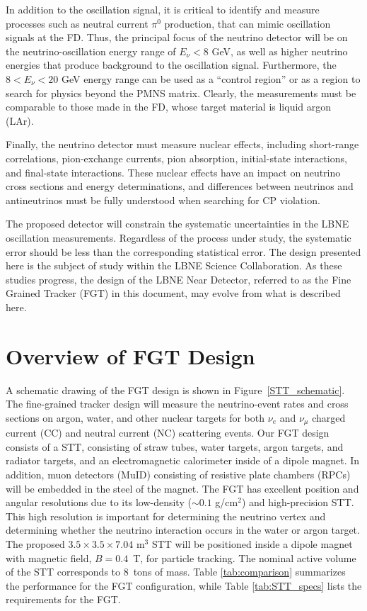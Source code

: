 In addition to the oscillation signal, it is 
critical to identify and measure processes such as neutral current $\pi^0$ production,
that can mimic oscillation signals 
at the FD. Thus, the principal focus of the neutrino detector will be 
on the neutrino-oscillation energy range of $E_\nu < 8$ GeV, as well as higher 
neutrino energies that produce background to the oscillation signal. Furthermore, the
$8<E_\nu < 20$ GeV energy range can be used as a ``control region'' or
as a region
to search for physics beyond the PMNS matrix. Clearly, 
the measurements must be 
comparable to those made in the FD, whose target material is liquid argon (LAr). 

Finally, the neutrino detector must measure nuclear effects, including
short-range correlations, pion-exchange currents, pion absorption, initial-state interactions, 
and final-state interactions. These nuclear effects %
have an impact on neutrino cross sections and energy determinations, and differences
between neutrinos and antineutrinos must be fully understood when searching
for CP violation.

The proposed detector will constrain the systematic uncertainties in the LBNE 
oscillation measurements. Regardless of the process under study, the 
systematic error should be less than the corresponding statistical error. 
The design presented here is the subject of study within the LBNE Science 
Collaboration. As these studies 
progress, the design of the LBNE Near Detector, 
referred to as the Fine Grained Tracker (FGT) in this document, may 
evolve from what is described here. 

\section{Overview of FGT Design}

A schematic drawing of the 
FGT design is shown in Figure~\ref{STT_schematic}. 
The fine-grained tracker 
design will measure the neutrino-event rates and cross sections 
on argon, water, and other nuclear 
targets for both $\nu_e$ and $\nu_\mu$ charged current (CC) and
neutral current (NC) scattering events. Our FGT design 
consists of a STT, consisting of straw tubes, water targets, argon targets, 
and radiator targets, and an electromagnetic calorimeter inside of a
dipole magnet. In addition, muon detectors (MuID) consisting of resistive plate
chambers (RPCs) will be embedded in the steel
of the magnet. The FGT has excellent position and angular resolutions due to
its low-density ($\sim 0.1$ g/cm$^2$) and high-precision STT. This high 
resolution is important for determining the neutrino
vertex and determining whether the neutrino interaction occurs in the water
or argon target.  The
proposed $3.5\times3.5\times7.04$ m$^3$ STT will be positioned inside a 
dipole magnet with magnetic field, $B = 0.4$~T, for particle tracking.
The nominal active volume of the STT corresponds to 8~tons of mass.
Table \ref{tab:comparison} summarizes the
performance for the FGT configuration, while
Table \ref{tab:STT_specs} lists the requirements for the FGT.


